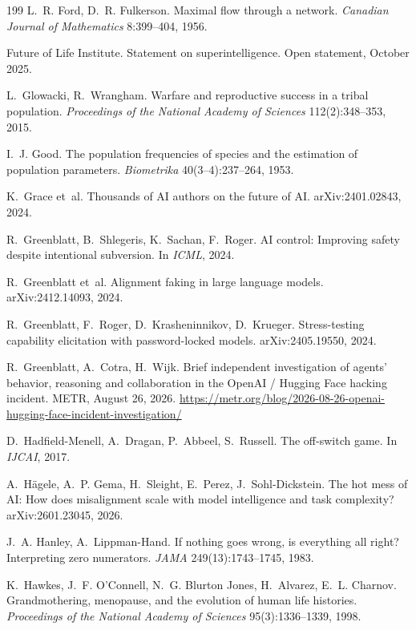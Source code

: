 \documentclass[10pt,twocolumn,letterpaper]{article}
\theoremstyle{definition}
\begin{document}
\begin{thebibliography}{199}
 L.~R. Ford, D.~R. Fulkerson. Maximal flow through a network. \emph{Canadian Journal of Mathematics} 8:399--404, 1956.

 Future of Life Institute. Statement on superintelligence. Open statement, October 2025.

 L.~Glowacki, R.~Wrangham. Warfare and reproductive success in a tribal population. \emph{Proceedings of the National Academy of Sciences} 112(2):348--353, 2015.

 I.~J. Good. The population frequencies of species and the estimation of population parameters. \emph{Biometrika} 40(3--4):237--264, 1953.

 K.~Grace et~al. Thousands of AI authors on the future of AI. arXiv:2401.02843, 2024.

 R.~Greenblatt, B.~Shlegeris, K.~Sachan, F.~Roger. AI control: Improving safety despite intentional subversion. In \emph{ICML}, 2024.

 R.~Greenblatt et~al. Alignment faking in large language models. arXiv:2412.14093, 2024.

 R.~Greenblatt, F.~Roger, D.~Krasheninnikov, D.~Krueger. Stress-testing capability elicitation with password-locked models. arXiv:2405.19550, 2024.

 R.~Greenblatt, A.~Cotra, H.~Wijk. Brief independent investigation of agents' behavior, reasoning and collaboration in the OpenAI / Hugging Face hacking incident. METR, August 26, 2026. \url{https://metr.org/blog/2026-08-26-openai-hugging-face-incident-investigation/}

 D.~Hadfield-Menell, A.~Dragan, P.~Abbeel, S.~Russell. The off-switch game. In \emph{IJCAI}, 2017.

 A.~H\"agele, A.~P. Gema, H.~Sleight, E.~Perez, J.~Sohl-Dickstein. The hot mess of AI: How does misalignment scale with model intelligence and task complexity? arXiv:2601.23045, 2026.

 J.~A. Hanley, A.~Lippman-Hand. If nothing goes wrong, is everything all right? Interpreting zero numerators. \emph{JAMA} 249(13):1743--1745, 1983.

 K.~Hawkes, J.~F. O'Connell, N.~G. Blurton Jones, H.~Alvarez, E.~L. Charnov. Grandmothering, menopause, and the evolution of human life histories. \emph{Proceedings of the National Academy of Sciences} 95(3):1336--1339, 1998.


\end{thebibliography}
\end{document}
